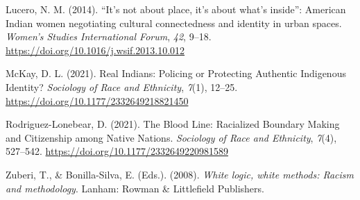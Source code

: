 \documentclass[
  12pt,
  letterpaper,
]{article}
\newlength{\cslhangindent}
\newlength{\cslentryspacingunit} %
\newenvironment{CSLReferences}[2] %
 {%
  \setlength{\parindent}{0pt}
  \ifodd #1
  \let\oldpar\par
  \def\par{\hangindent=\cslhangindent\oldpar}
  \fi
  \setlength{\parskip}{#2\cslentryspacingunit}
 }%
 {}
\begin{document}
\begin{CSLReferences}{1}{0}
\leavevmode{}%
Lucero, N. M. (2014). {``{It}'s not about place, it's about what's
inside''}: {American} {Indian} women negotiating cultural connectedness
and identity in urban spaces. \emph{Women's Studies International
Forum}, \emph{42}, 9--18.
\url{https://doi.org/10.1016/j.wsif.2013.10.012}

\leavevmode{}%
McKay, D. L. (2021). Real {Indians}: {Policing} or {Protecting}
{Authentic} {Indigenous} {Identity}? \emph{Sociology of Race and
Ethnicity}, \emph{7}(1), 12--25.
\url{https://doi.org/10.1177/2332649218821450}

\leavevmode{}%
Rodriguez-Lonebear, D. (2021). The {Blood} {Line}: {Racialized}
{Boundary} {Making} and {Citizenship} among {Native} {Nations}.
\emph{Sociology of Race and Ethnicity}, \emph{7}(4), 527--542.
\url{https://doi.org/10.1177/2332649220981589}

\leavevmode{}%
Zuberi, T., \& Bonilla-Silva, E. (Eds.). (2008). \emph{White logic,
white methods: Racism and methodology}. Lanham: Rowman \& Littlefield
Publishers.

\end{CSLReferences}
\end{document}
